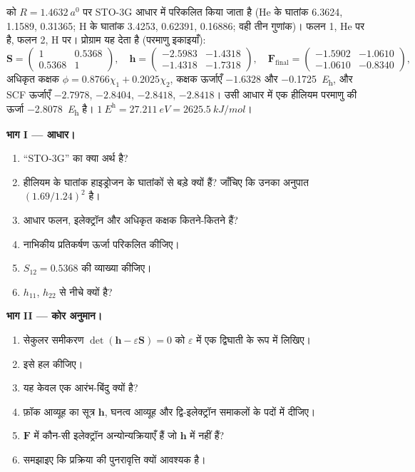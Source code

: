 \begin{problem}
\label{pb:b3:computational-chemistry:1}
 को $R = \qty{1.4632}{\bohr}$ पर STO-3G आधार में परिकलित किया जाता है (He
के घातांक 6.3624, 1.1589, 0.31365; H के घातांक 3.4253, 0.62391, 0.16886; वही
तीन गुणांक)। फलन 1, He पर है, फलन 2, H पर। प्रोग्राम
यह देता है (परमाणु इकाइयाँ):
\[
\mathbf S = \begin{pmatrix}1 & 0.5368\\ 0.5368 & 1\end{pmatrix},\quad
\mathbf h = \begin{pmatrix}-2.5983 & -1.4318\\ -1.4318 & -1.7318\end{pmatrix},\quad
\mathbf F_{\mathrm{final}} = \begin{pmatrix}-1.5902 & -1.0610\\ -1.0610 & -0.8340
\end{pmatrix},
\]
अधिकृत कक्षक $\phi = 0.8766\chi_1 + 0.2025\chi_2$, कक्षक ऊर्जाएँ
$-1.6328$ और \qty{-0.1725}{\hartree}, और SCF ऊर्जाएँ $-2.7978$, $-2.8404$,
$-2.8418$, $-2.8418$। उसी आधार में एक हीलियम परमाणु की ऊर्जा
\qty{-2.8078}{\hartree} है। $\qty{1}{\hartree} = \qty{27.211}{eV} =
\qty{2625.5}{kJ/mol}$।

\medskip\noindent\textbf{भाग I --- आधार।}
\begin{enumerate}
  \item ``STO-3G'' का क्या अर्थ है?
  \item हीलियम के घातांक हाइड्रोजन के घातांकों से बड़े क्यों हैं? जाँचिए
        कि उनका अनुपात $(1.69/1.24)^2$ है।
  \item आधार फलन, इलेक्ट्रॉन और अधिकृत कक्षक कितने-कितने हैं?
  \item नाभिकीय प्रतिकर्षण ऊर्जा परिकलित कीजिए।
  \item $S_{12} = 0.5368$ की व्याख्या कीजिए।
  \item $h_{11}$, $h_{22}$ से नीचे क्यों है?
\end{enumerate}

\medskip\noindent\textbf{भाग II --- कोर अनुमान।}
\begin{enumerate}[resume]
  \item सेकुलर समीकरण $\det(\mathbf h - \varepsilon\mathbf S) = 0$ को
        $\varepsilon$ में एक द्विघाती के रूप में लिखिए।
  \item इसे हल कीजिए।
  \item यह केवल एक आरंभ-बिंदु क्यों है?
  \item फ़ॉक आव्यूह का सूत्र $\mathbf h$,
        घनत्व आव्यूह और द्वि-इलेक्ट्रॉन समाकलों के पदों में दीजिए।
  \item $\mathbf F$ में कौन-सी इलेक्ट्रॉन अन्योन्यक्रियाएँ हैं जो $\mathbf h$ में नहीं हैं?
  \item समझाइए कि प्रक्रिया की पुनरावृत्ति क्यों आवश्यक है।
\end{enumerate}


\end{problem}
